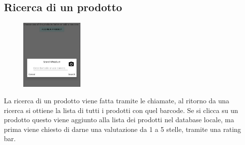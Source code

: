 \documentclass[12pt]{article}
\begin{document}
    \subsection{Ricerca di un prodotto}
    \begin{figure}
        \includegraphics[height=3.5cm]{img/search.PNG}
    \end{figure}
    La ricerca di un prodotto viene fatta tramite le chiamate, al ritorno da una ricerca si ottiene la lista di tutti i prodotti con 
    quel barcode. Se si clicca su un prodotto questo viene aggiunto alla lista dei prodotti nel database locale, ma prima viene chiesto di 
    darne una valutazione da 1 a 5 stelle, tramite una rating bar.
    \\\\\\
\end{document}
